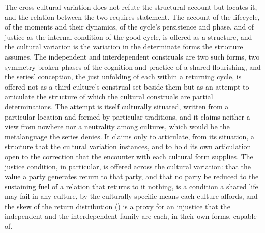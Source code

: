 The cross-cultural variation does not refute the structural account but locates it, and the relation between the two requires statement. The account of the lifecycle, of the moments and their dynamics, of the cycle's persistence and phase, and of justice as the internal condition of the good cycle, is offered as a structure, and the cultural variation is the variation in the determinate forms the structure assumes. The independent and interdependent construals are two such forms, two symmetry-broken phases of the cognition and practice of a shared flourishing, and the series' conception, the just unfolding of each within a returning cycle, is offered not as a third culture's construal set beside them but as an attempt to articulate the structure of which the cultural construals are partial determinations. The attempt is itself culturally situated, written from a particular location and formed by particular traditions, and it claims neither a view from nowhere nor a neutrality among cultures, which would be the metalanguage the series denies. It claims only to articulate, from its situation, a structure that the cultural variation instances, and to hold its own articulation open to the correction that the encounter with each cultural form supplies. The justice condition, in particular, is offered across the cultural variation: that the value a party generates return to that party, and that no party be reduced to the sustaining fuel of a relation that returns to it nothing, is a condition a shared life may fail in any culture, by the culturally specific means each culture affords, and the skew of the return distribution () is a proxy for an injustice that the independent and the interdependent family are each, in their own forms, capable of.
